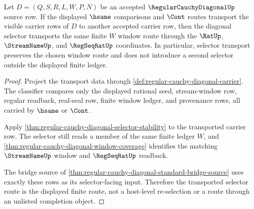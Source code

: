 \begin{theorem}
\label{thm:regular-cauchy-diagonal-selector-window-functoriality}
Let $D=(Q,S,R,L,W,P,N)$ be an accepted $\RegularCauchyDiagonalUp$ source row. If the displayed $\hsame$ comparisons and $\Cont$ routes transport the visible carrier rows of $D$ to another accepted carrier row, then the diagonal selector transports the same finite $W$ window route through the $\RatUp$, $\StreamNameUp$, and $\RegSeqRatUp$ coordinates. In particular, selector transport preserves the chosen window route and does not introduce a second selector outside the displayed finite ledger.
\end{theorem}
\begin{proof}
Project the transport data through \autoref{def:regular-cauchy-diagonal-carrier}. The classifier compares only the displayed rational seed, stream-window row, regular readback, real-seal row, finite window ledger, and provenance rows, all carried by $\hsame$ or $\Cont$.

Apply \autoref{thm:regular-cauchy-diagonal-selector-stability} to the transported carrier row. The selector still reads a member of the same finite ledger $W$, and \autoref{thm:regular-cauchy-diagonal-window-coverage} identifies the matching $\StreamNameUp$ window and $\RegSeqRatUp$ readback.

The bridge source of \autoref{thm:regular-cauchy-diagonal-standard-bridge-source} uses exactly these rows as its selector-facing input. Therefore the transported selector route is the displayed finite route, not a host-level re-selection or a route through an unlisted completion object.
\end{proof}

